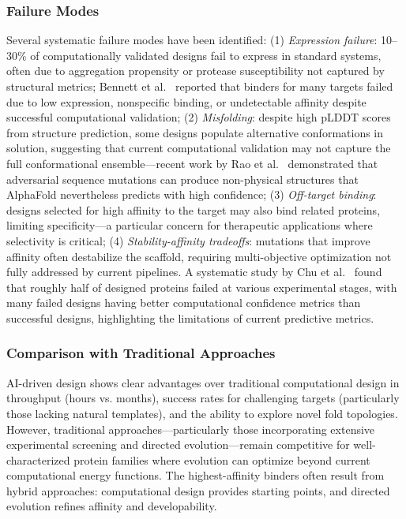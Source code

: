 \subsubsection{Failure Modes}

Several systematic failure modes have been identified: (1) \textit{Expression failure}: 10--30\% of computationally validated designs fail to express in standard systems, often due to aggregation propensity or protease susceptibility not captured by structural metrics; Bennett et al.~\citep{bennett2025low} reported that binders for many targets failed due to low expression, nonspecific binding, or undetectable affinity despite successful computational validation; (2) \textit{Misfolding}: despite high pLDDT scores from structure prediction, some designs populate alternative conformations in solution, suggesting that current computational validation may not capture the full conformational ensemble---recent work by Rao et al.~\citep{rao2026adversarial} demonstrated that adversarial sequence mutations can produce non-physical structures that AlphaFold nevertheless predicts with high confidence; (3) \textit{Off-target binding}: designs selected for high affinity to the target may also bind related proteins, limiting specificity---a particular concern for therapeutic applications where selectivity is critical; (4) \textit{Stability-affinity tradeoffs}: mutations that improve affinity often destabilize the scaffold, requiring multi-objective optimization not fully addressed by current pipelines. A systematic study by Chu et al.~\citep{chu2025prediction} found that roughly half of designed proteins failed at various experimental stages, with many failed designs having better computational confidence metrics than successful designs, highlighting the limitations of current predictive metrics.

\subsubsection{Comparison with Traditional Approaches}

AI-driven design shows clear advantages over traditional computational design in throughput (hours vs. months), success rates for challenging targets (particularly those lacking natural templates), and the ability to explore novel fold topologies. However, traditional approaches---particularly those incorporating extensive experimental screening and directed evolution---remain competitive for well-characterized protein families where evolution can optimize beyond current computational energy functions. The highest-affinity binders often result from hybrid approaches: computational design provides starting points, and directed evolution refines affinity and developability.

